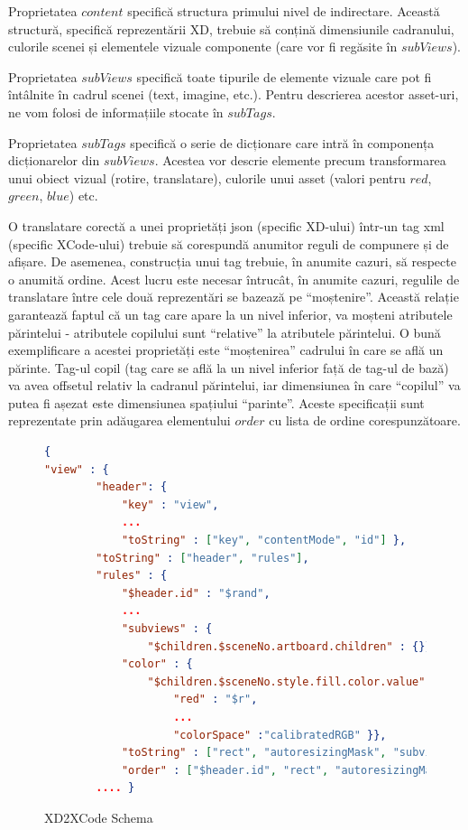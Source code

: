 Proprietatea $content$ specifică structura primului nivel de indirectare. Această structură, specifică reprezentării XD,  trebuie să conțină dimensiunile cadranului, culorile scenei și elementele vizuale componente (care vor fi regăsite în $subViews$).

Proprietatea $subViews$ specifică toate tipurile de elemente vizuale care pot fi întâlnite în cadrul scenei (text, imagine, etc.). Pentru descrierea acestor asset-uri, ne vom folosi de informațiile stocate în $subTags$.

Proprietatea $subTags$ specifică o serie de dicționare care intră în componența dicționarelor din $subViews$. Acestea vor descrie elemente precum transformarea unui obiect vizual (rotire, translatare), culorile unui asset (valori pentru $red$, $green$, $blue$) etc.

O translatare corectă a unei proprietăți json (specific XD-ului) într-un tag xml (specific XCode-ului) trebuie să corespundă anumitor reguli de compunere și de afișare. De asemenea, construcția unui tag trebuie, în anumite cazuri, să respecte o anumită ordine. Acest lucru este necesar întrucât, în anumite cazuri, regulile de translatare între cele două reprezentări se bazează pe “moștenire”. Această relație garantează faptul că un tag care apare la un nivel inferior, va moșteni atributele părintelui - atributele copilului sunt “relative” la atributele părintelui. O bună exemplificare a acestei proprietăți este “moștenirea” cadrului în care se află un părinte. Tag-ul copil (tag care se află la un nivel inferior față de tag-ul de bază) va avea offsetul relativ la cadranul părintelui, iar dimensiunea în care “copilul” va putea fi așezat este dimensiunea spațiului “parinte”. Aceste specificații sunt reprezentate prin adăugarea elementului $order$ cu lista de ordine corespunzătoare.

\begin{figure}
\begin{lstlisting}[language=json,firstnumber=1]
{
"view" : {
        "header": {
            "key" : "view",
            ...
            "toString" : ["key", "contentMode", "id"] },
        "toString" : ["header", "rules"],
        "rules" : { 
            "$header.id" : "$rand",
            ...
            "subviews" : {
                "$children.$sceneNo.artboard.children" : {}},
            "color" : {
                "$children.$sceneNo.style.fill.color.value" : {
                    "red" : "$r",
                    ...
                    "colorSpace" :"calibratedRGB" }},
            "toString" : ["rect", "autoresizingMask", "subviews", "color"],
            "order" : ["$header.id", "rect", "autoresizingMask", "color", "subviews"] }
        .... }
\end{lstlisting}
\caption{XD2XCode Schema} \label{fig:XD2XCode Schema}
\end{figure}

